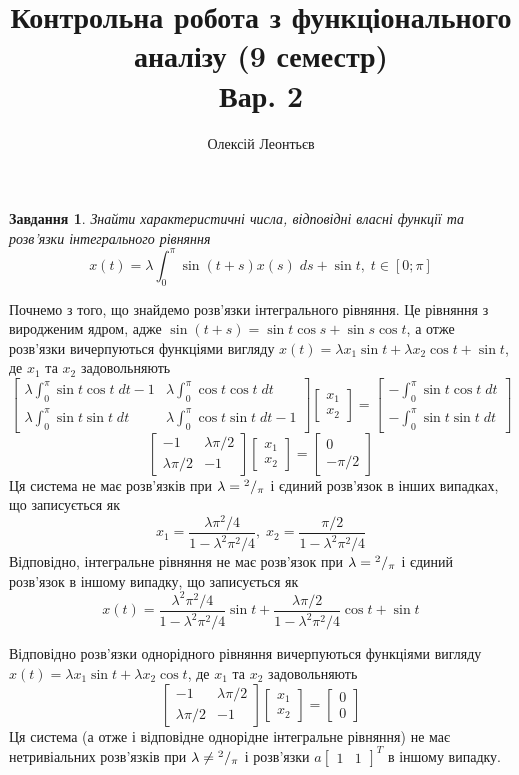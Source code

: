 \documentclass[10pt]{article}
\title{Контрольна робота з функціонального аналізу (9 семестр)\\Вар. 2}
\author{Олексій Леонтьєв}
\newtheorem{prob}{Завдання}
\newcommand{\ds}{\;ds}
\newcommand{\dt}{\;dt}
\begin{document}
\maketitle
\setcounter{prob}{8}
\begin{prob}
	Знайти характеристичні числа, відповідні власні функції та розв’язки інтегрального рівняння
	\[x(t)=\lambda\int_{0}^{\pi}\sin(t+s) x(s)\ds+\sin t,\;t\in[0;\pi]\]
\end{prob}
	Почнемо з того, що знайдемо розв’язки інтегрального рівняння. Це рівняння з виродженим ядром, адже $\sin(t+s)=\sin t\cos s+
	\sin s\cos t$, а отже розв’язки вичерпуються функціями вигляду
	$x(t)=\lambda x_1\sin t+\lambda x_2\cos t+\sin t$, де $x_1$ та $x_2$ задовольняють
	\[\begin{bmatrix}
		\lambda\int_0^\pi \sin t\cos t\dt-1 & \lambda\int_0^\pi\cos t\cos t\dt\\
		\lambda\int_0^\pi \sin t\sin t\dt & \lambda\int_0^\pi\cos t\sin t\dt-1
	\end{bmatrix}
	\begin{bmatrix}x_1\\x_2\end{bmatrix}=\begin{bmatrix}-\int_0^\pi\sin t\cos t\dt\\
		-\int_0^\pi\sin t\sin t\dt\end{bmatrix}\]
	\[\begin{bmatrix}
		-1&\lambda\pi/2\\
		\lambda\pi/2&-1
	\end{bmatrix}
	\begin{bmatrix}x_1\\x_2\end{bmatrix}=\begin{bmatrix}0\\-\pi/2\end{bmatrix}\]
	Ця система не має розв’язків при $\lambda={^{2}/_{\pi}}$ і єдиний розв’язок в інших випадках, що записується як
	\[x_1=\frac{\lambda\pi^2/4}{1-\lambda^2\pi^2/4},\;x_2=\frac{\pi/2}{1-\lambda^2\pi^2/4}\]
	Відповідно, інтегральне рівняння не має розв’язок при $\lambda={^{2}/_{\pi}}$ і єдиний розв’язок в іншому випадку, що
	записується як
	\[x(t)=\frac{\lambda^2\pi^2/4}{1-\lambda^2\pi^2/4}\sin t+\frac{\lambda\pi/2}{1-\lambda^2\pi^2/4}\cos t+\sin t\]

	Відповідно розв’язки однорідного рівняння вичерпуються функціями вигляду
	$x(t)=\lambda x_1\sin t+\lambda x_2\cos t$, де $x_1$ та $x_2$ задовольняють
	\[\begin{bmatrix}
		-1&\lambda\pi/2\\
		\lambda\pi/2&-1
	\end{bmatrix}
	\begin{bmatrix}x_1\\x_2\end{bmatrix}=\begin{bmatrix}0\\0\end{bmatrix}\]
	Ця система (а отже і відповідне однорідне інтегральне рівняння) не має нетривіальних розв’язків при 
	$\lambda\neq{^{2}/_{\pi}}$ і розв’язки $a\begin{bmatrix}1&1\end{bmatrix}^T$ в іншому випадку.
\end{document}

